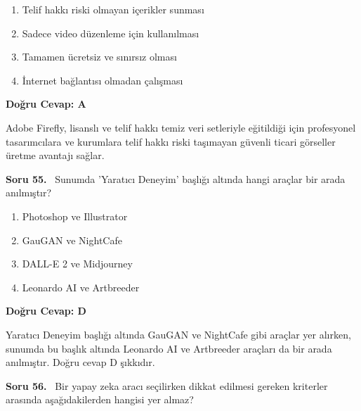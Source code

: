 \documentclass[11pt,a4paper,openany]{book}
\begin{document}
\begin{enumerate}[label=\Alph*), leftmargin=25pt, topsep=4pt, itemsep=2pt]
        \item Telif hakkı riski olmayan içerikler sunması
        \item Sadece video düzenleme için kullanılması
        \item Tamamen ücretsiz ve sınırsız olması
        \item İnternet bağlantısı olmadan çalışması
\end{enumerate}

\vspace{4pt}
\begin{tcolorbox}[title=Cevap ve Açıklama, colback=gray!3!white, colframe=primarycolor!90!black, arc=2mm, fonttitle=\bfseries\sffamily, top=6pt, bottom=6pt]
    \textbf{Doğru Cevap: A}

    \vspace{2pt}
    Adobe Firefly, lisanslı ve telif hakkı temiz veri setleriyle eğitildiği için profesyonel tasarımcılara ve kurumlara telif hakkı riski taşımayan güvenli ticari görseller üretme avantajı sağlar.
\end{tcolorbox}
\vspace{10pt}
\needspace{5cm}
\vspace{8pt}
\noindent\textbf{\large\sffamily Soru 55.} \ Sunumda 'Yaratıcı Deneyim' başlığı altında hangi araçlar bir arada anılmıştır?

\begin{enumerate}[label=\Alph*), leftmargin=25pt, topsep=4pt, itemsep=2pt]
        \item Photoshop ve Illustrator
        \item GauGAN ve NightCafe
        \item DALL-E 2 ve Midjourney
        \item Leonardo AI ve Artbreeder
\end{enumerate}

\vspace{4pt}
\begin{tcolorbox}[title=Cevap ve Açıklama, colback=gray!3!white, colframe=primarycolor!90!black, arc=2mm, fonttitle=\bfseries\sffamily, top=6pt, bottom=6pt]
    \textbf{Doğru Cevap: D}

    \vspace{2pt}
    Yaratıcı Deneyim başlığı altında GauGAN ve NightCafe gibi araçlar yer alırken, sunumda bu başlık altında Leonardo AI ve Artbreeder araçları da bir arada anılmıştır. Doğru cevap D şıkkıdır.
\end{tcolorbox}
\vspace{10pt}
\needspace{5cm}
\vspace{8pt}
\noindent\textbf{\large\sffamily Soru 56.} \ Bir yapay zeka aracı seçilirken dikkat edilmesi gereken kriterler arasında aşağıdakilerden hangisi yer almaz?
\end{document}
